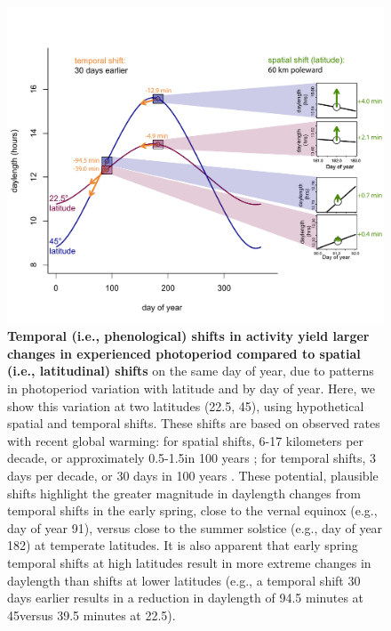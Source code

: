 \documentclass{article}
\begin{document}
\begin{figure}[h]
\centering
\includegraphics{..//..//analyses/photoperiod/figures/photo_spacetime_v4b_newcolors.pdf} %
\caption{\textbf{Temporal (i.e., phenological) shifts in activity yield larger changes in experienced photoperiod compared to spatial (i.e., latitudinal) shifts} on the same day of year, due to patterns in photoperiod variation with latitude and by day of year. Here, we show this variation at two latitudes (22.5\degree, 45\degree), using hypothetical spatial and temporal shifts. These shifts are based on observed rates with recent global warming: for spatial shifts, 6-17 kilometers per decade, or approximately 0.5-1.5\degree in 100 years \citep{parmesan2003,parmesan2006}; for temporal shifts, 3 days per decade, or 30 days in 100 years \citep{parmesan2006,chen2011}. These potential, plausible shifts highlight the greater magnitude in daylength changes from temporal shifts in the early spring, close to the vernal equinox (e.g., day of year 91), versus close to the summer solstice (e.g., day of year 182) at temperate latitudes.  It is also apparent that early spring temporal shifts at high latitudes result in more extreme changes in daylength than shifts at lower latitudes (e.g., a temporal shift 30 days earlier results in a reduction in daylength of 94.5 minutes at 45\degree  versus 39.5 minutes at 22.5\degree).}
 \label{fig:spacetime}%
 \end{figure}
 
\end{document}
